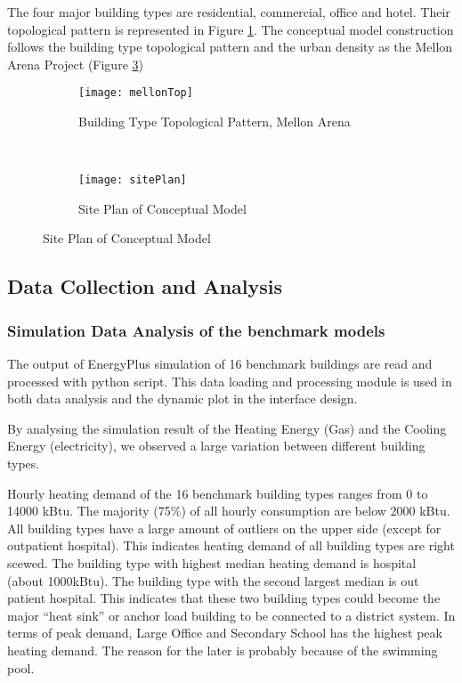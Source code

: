 \documentclass[hidelinks,12pt]{article}
\newcommand{\fref}[1]{Figure \ref{#1}}
\begin{document}
The four major building types are residential, commercial, office and
hotel. Their topological pattern is represented in Figure
\ref{fig:mellonTop}. The conceptual model construction follows the
building type topological pattern and the urban density as the Mellon
Arena Project (\fref{fig:sitePlan})
\begin{figure}[h!]
  \centering
  \begin{subfigure}
  \centering
  \texttt{[image: mellonTop]}
  \caption{Building Type Topological Pattern, Mellon Arena}
  \label{fig:mellonTop}
  \end{subfigure}
  ~
  \begin{subfigure}
  \centering
  \texttt{[image: sitePlan]}
  \caption{Site Plan of Conceptual Model}
  \label{fig:sitePlan}
  \end{subfigure}
\end{figure}   

\subsection{Data Collection and Analysis}
\subsubsection{Simulation Data Analysis of the benchmark
  models}\label{boxPlot}
The output of EnergyPlus simulation of 16 benchmark buildings are read
and processed with python script. This data loading and processing
module is used in both data analysis and the dynamic plot in the
interface design.

By analysing the simulation result of the Heating Energy (Gas) and the
Cooling Energy (electricity), we observed a large variation between
different building types.

Hourly heating demand of the 16 benchmark building types ranges from 0
to 14000 kBtu. The majority (75\%) of all hourly consumption are below
2000 kBtu. All building types have a large amount of outliers on the
upper side (except for outpatient hospital). This indicates heating
demand of all building types are right scewed. The building type with
highest median heating demand is hospital (about 1000kBtu). The
building type with the second largest median is out patient
hospital. This indicates that these two building types could become
the major ``heat sink'' or anchor load building to be connected to a
district system. In terms of peak demand, Large Office and Secondary
School has the highest peak heating demand. The reason for the later
is probably because of the swimming pool.
\end{document}
